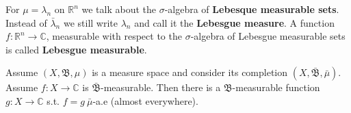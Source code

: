 For \(\mu = \lambda_n\) on \(\mathbb{R}^n\) we talk about the \(\sigma\)-algebra of \textbf{Lebesque measurable sets}. Instead of 
\(\bar{\lambda}_n\) we still write \(\lambda_n\) and call it the \textbf{Lebesgue measure}. A function \(f: \mathbb{R}^n\rightarrow \mathbb{C}\),
measurable with respect to the \(\sigma\)-algebra of Lebesgue measurable sets is called \textbf{Lebesgue measurable}.

\begin{prop}
    Assume \((X, \mathfrak{B}, \mu)\) is a measure space and consider its completion \((X, \bar{\mathfrak{B}}, \bar{\mu})\). Assume 
    \(f: X\rightarrow \mathbb{C}\) is \(\bar{\mathfrak{B}}\)-measurable. Then there is a \(\mathfrak{B}\)-measurable function
    \(g:X\rightarrow \mathbb{C}\) s.t. \(f=g \ \bar{\mu}\)-a.e (almost everywhere).
\end{prop}

